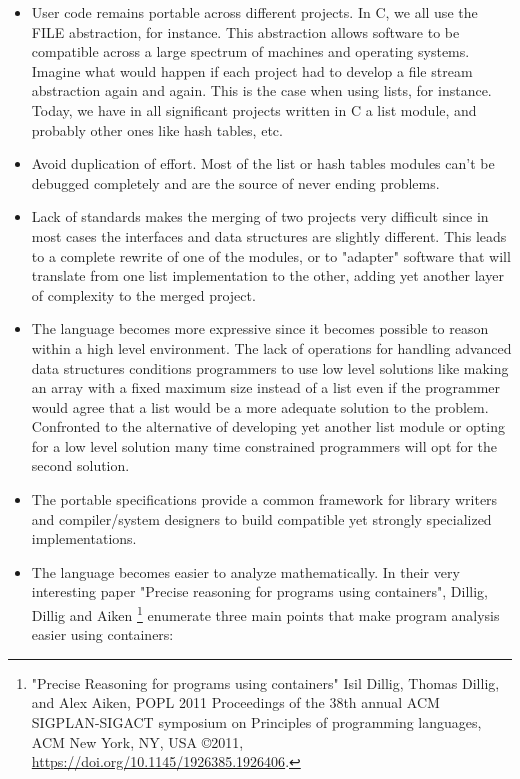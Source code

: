 \begin{itemize}
\item
User code remains portable across different projects. In C, we all use the FILE abstraction, for instance. This abstraction allows software to be 
compatible across a large spectrum of machines and operating systems. Imagine what would happen if each project had to develop a file stream
abstraction again and again. This is the case when using lists, for instance. Today, we have in all significant projects written in C a list
module, and probably other ones like hash tables, etc. 

\item Avoid duplication of effort. Most of the list or hash tables modules can't be debugged completely and are the source of never ending problems.
\item Lack of standards makes the merging of two projects very difficult since in most cases the interfaces and data structures are slightly
different. This leads to a complete rewrite of one of the modules, or to "adapter" software that will translate from one list implementation
to the other, adding yet another layer of complexity to the merged project.
\item The language becomes more expressive since it becomes possible to reason within a high level environment. The lack of operations for
handling advanced data structures conditions programmers to use low level solutions like making an array with a fixed maximum size instead of a
list even if the programmer would agree that a list would be a more adequate solution to the problem. Confronted to the alternative of
developing yet another list module or opting for a low level solution many time constrained programmers will opt for the second solution.
\item
The portable specifications provide a common framework for library writers and compiler/system designers to build compatible yet strongly specialized implementations.
\item
The language becomes easier to analyze mathematically.
In their very interesting paper "Precise reasoning for programs using containers", Dillig, Dillig and Aiken
\footnote{"Precise Reasoning for programs using containers" Isil Dillig, Thomas Dillig, and Alex Aiken, POPL 2011 Proceedings of the 38th annual ACM SIGPLAN-SIGACT symposium on Principles of programming languages, ACM New York, NY, USA \copyright 2011, \url{https://doi.org/10.1145/1926385.1926406}.} enumerate three main points that make program analysis easier using containers:

\end{itemize}

